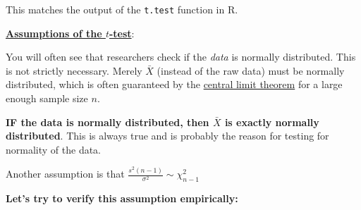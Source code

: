 \documentclass[
]{book}
\begin{document}
This matches the output of the \texttt{t.test} function in R.

\textbf{\href{https://en.wikipedia.org/wiki/Student\%27s_t-test\#Assumptions}{Assumptions of the \(t\)-test}}:

You will often see that researchers check if the \emph{data} is normally distributed.
This is not strictly necessary. Merely \(\bar{X}\) (instead of the raw data) must be normally distributed, which is
often guaranteed by the
\href{https://en.wikipedia.org/wiki/Central_limit_theorem}{central limit theorem} for a
large enough sample size \(n\).

\textbf{IF the data is normally distributed, then \(\bar{X}\) is exactly normally distributed}.
This is always true
and is probably the reason for testing for normality of the data.

Another assumption is that \(\frac{s^2(n-1)}{\sigma^2} \sim \chi^2_{n-1}\)

\textbf{Let's try to verify this assumption empirically:}
\end{document}
